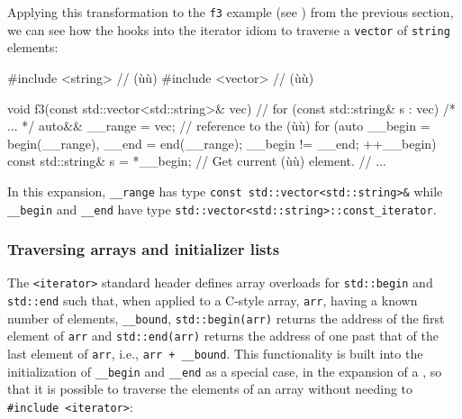 {{Applying this transformation to the \lstinline!f3! example (see \pageref{iterating-over-std::vector-with-a-range-based-for-loop}) from the previous section, we can see how the
 hooks into the iterator idiom to
traverse a \lstinline!vector! of \lstinline!string! elements:

\begin{emcppslisting}
#include <string>  // (ù{}ù)
#include <vector>  // (ù{}ù)

void f3(const std::vector<std::string>& vec)
{
    // for (const std::string& s : vec) { /* ... */ }
    {
        auto&& __range = vec;  // reference to the (ù{}ù)
        for (auto __begin = begin(__range), __end = end(__range);
            __begin != __end;
            ++__begin)
        {
            const std::string& s = *__begin;  // Get current (ù{}ù) element.
            {
                // ...
            }
        }
    }
}
\end{emcppslisting}
    

\noindent In this expansion, \lstinline!__range! has type
\lstinline!const!~\lstinline!std::vector<std::string>&! while
\lstinline!__begin! and \lstinline!__end! have type
\lstinline!std::vector<std::string>::const_iterator!.

\subsubsection[Traversing arrays and initializer lists]{Traversing arrays and initializer lists}\label{traversing-arrays-and-initializer-lists}

The \lstinline!<iterator>! standard header defines array overloads for
\lstinline!std::begin! and \lstinline!std::end! such that, when applied to a
C-style array, \lstinline!arr!, having a known number of elements,
\lstinline!__bound!, \lstinline!std::begin(arr)! returns the address of the
first element of \lstinline!arr! and \lstinline!std::end(arr)! returns the
address of one past that of the last element of \lstinline!arr!, i.e.,
\lstinline!arr!~\lstinline!+!~\lstinline!__bound!. This functionality is built
into the initialization of \lstinline!__begin! and \lstinline!__end! as a
special case, in the expansion of a , so that it is possible to traverse the elements of an array
without needing to \lstinline!#include!~\lstinline!<iterator>!:

}}
